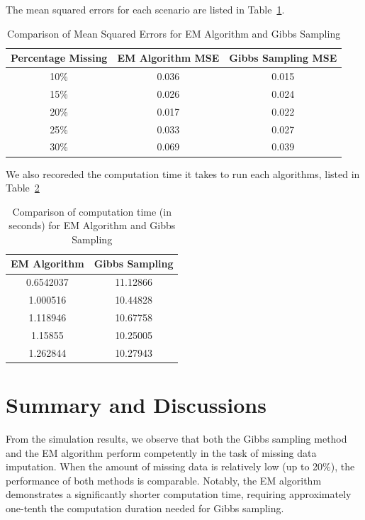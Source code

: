 \documentclass[12pt]{article}
\begin{document}
The mean squared errors for each scenario are listed in Table~\ref{tab:mse_comparison}.

\begin{table}[h]
\centering
\begin{tabular}{ccc}
\hline
\textbf{Percentage Missing} & \textbf{EM Algorithm MSE} & \textbf{Gibbs Sampling MSE} \\
\hline
10\% & 0.036 & 0.015 \\
15\% & 0.026 & 0.024 \\
20\% & 0.017 & 0.022\\
25\% & 0.033 & 0.027 \\
30\% & 0.069 & 0.039\\
\hline
\end{tabular}
\caption{Comparison of Mean Squared Errors for EM Algorithm and Gibbs Sampling}
\label{tab:mse_comparison}
\end{table}

We also recoreded the computation time it takes to run each algorithms, listed in Table~\ref{tab:time_comparison}

\begin{table}[h]
\centering
\begin{tabular}{cc}
\hline
\textbf{EM Algorithm} & \textbf{Gibbs Sampling} \\
\hline
0.6542037 & 11.12866 \\
1.000516 & 10.44828 \\
1.118946 & 10.67758 \\
1.15855 & 10.25005 \\
1.262844 & 10.27943 \\
\hline
\end{tabular}
\caption{Comparison of computation time (in seconds) for EM Algorithm and Gibbs Sampling}
\label{tab:time_comparison}
\end{table}
\section{Summary and Discussions}

From the simulation results, we observe that both the Gibbs sampling method and the EM algorithm perform competently in the task of missing data imputation. When the amount of missing data is relatively low (up to 20\%), the performance of both methods is comparable. Notably, the EM algorithm demonstrates a significantly shorter computation time, requiring approximately one-tenth the computation duration needed for Gibbs sampling.
\end{document}
